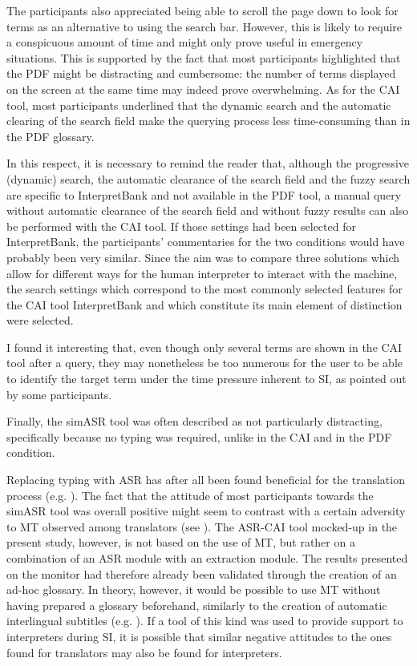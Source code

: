 The participants also appreciated being able to scroll the page down to look for terms as an alternative to using the search bar. However, this is likely to require a conspicuous amount of time and might only prove useful in emergency situations. This is supported by the fact that most participants highlighted that the PDF might be distracting and cumbersome: the number of terms displayed on the screen at the same time may indeed prove overwhelming.
As for the CAI tool, most participants underlined that the dynamic search and the automatic clearing of the search field make the querying process less time-consuming than in the PDF glossary.

In this respect, it is necessary to remind the reader that, although the progressive (dynamic) search, the automatic clearance of the search field and the fuzzy search are specific to InterpretBank and not available in the PDF tool, a manual query without automatic clearance of the search field and without fuzzy results can also be performed with the CAI tool. If those settings had been selected for InterpretBank, the participants' commentaries for the two conditions would have probably been very similar. Since the aim was to compare three solutions which allow for different ways for the human interpreter to interact with the machine, the search settings which correspond to the most commonly selected features for the CAI tool InterpretBank and which constitute its main element of distinction were selected.

I found it interesting that, even though only several terms are shown in the CAI tool after a query, they may nonetheless be too numerous for the user to be able to identify the target term under the time pressure inherent to SI, as pointed out by some participants.

Finally, the simASR tool was often described as not particularly distracting, specifically because no typing was required, unlike in the CAI and in the PDF condition.

Replacing typing with ASR has after all been found beneficial for the translation process (e.g. \citealt{carl_comparing_2016}). The fact that the attitude of most participants towards the simASR tool was overall positive might seem to contrast with a certain adversity to MT observed among translators (see ). The ASR-CAI tool mocked-up in the present study, however, is not based on the use of MT, but rather on a combination of an ASR module with an extraction module. The results presented on the monitor had therefore already been validated through the creation of an ad-hoc glossary. In theory, however, it would be possible to use MT without having prepared a glossary beforehand, similarly to the creation of automatic interlingual subtitles (e.g. \citealt{dessloch2018kit}). If a tool of this kind was used to provide support to interpreters during SI, it is possible that similar negative attitudes to the ones found for translators may also be found for interpreters.


